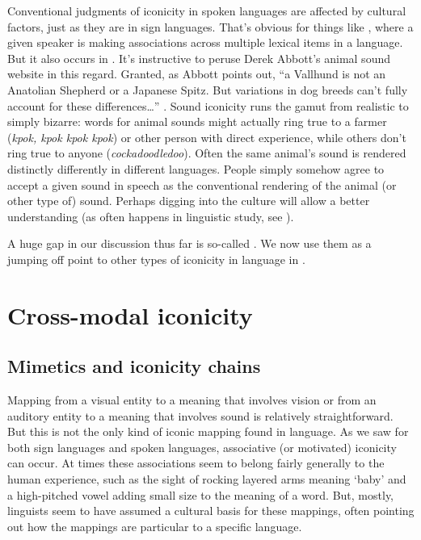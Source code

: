 \documentclass[output=paper,
modfonts
]{LSP/langsci}
\begin{document}
Conventional judgments of iconicity in spoken languages are affected by
cultural factors, just as they are in sign languages. That's obvious for
things like , where a given speaker is making associations
across multiple lexical items in a language. But it also occurs in
. It's instructive to peruse Derek Abbott's \citeyearpar{abbott2004} animal
sound website in this regard. Granted, as Abbott points out, ``a 
Vallhund is not an Anatolian Shepherd or a Japanese Spitz. But
variations in dog breeds can't fully account for these
differences\ldots{}'' \citep{friedman2015}. Sound iconicity runs the gamut
from realistic to simply bizarre: words for animal sounds might actually
ring true to a farmer (\emph{kpok, kpok kpok kpok}) or other person with
direct experience, while others don't ring true to anyone
(\emph{cockadoodledoo}). Often the same animal's sound is rendered
distinctly differently in different languages. People simply somehow
agree to accept a given sound in speech as the conventional rendering of
the animal (or other type of) sound. Perhaps digging into the culture
will allow a better understanding (as often happens in linguistic study,
see \citealt{duranti2009}).

A huge gap in our discussion thus far is so-called . We now use
them as a jumping off point to other types of iconicity in language in
.

\section{Cross-modal iconicity}\label{sec:napoli:5}

\subsection{Mimetics and iconicity chains}

Mapping from a visual entity to a meaning that involves vision or from
an auditory entity to a meaning that involves sound is relatively
straightforward. But this is not the only kind of iconic mapping found
in language. As we saw for both sign languages and spoken languages,
associative (or motivated) iconicity can occur. At times these
associations seem to belong fairly generally to the human experience,
such as the sight of rocking layered arms meaning `baby' and a
high-pitched vowel adding small size to the meaning of a word. But,
mostly, linguists seem to have assumed a cultural basis for these
mappings, often pointing out how the mappings are particular to a
specific language.
\end{document}
